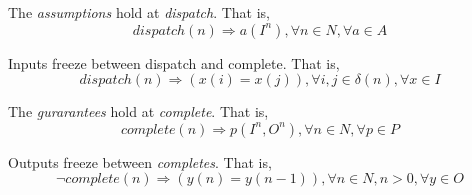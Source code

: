 The \emph{assumptions} hold at \emph{dispatch}. That is,
\begin{equation} 
\label{eqn:assumption}
dispatch(n) \Rightarrow a(I^n), \forall n\in N, \forall a \in A
\end{equation}

Inputs freeze between dispatch and complete. That is,
\begin{equation} 
\label{eqn:inputfreeze}
dispatch(n) \Rightarrow (x(i) = x(j)), \forall i,j\in \delta(n), \forall x \in I
\end{equation}

The \emph{gurarantees} hold at \emph{complete}. That is,
\begin{equation} 
\label{eqn:guarantee}
complete(n) \Rightarrow p(I^n, O^n), \forall n\in N, \forall p \in P
\end{equation}

Outputs freeze between \emph{completes}. That is,
\begin{equation} 
\label{eqn:outputfreeze}
\lnot complete(n) \Rightarrow (y(n) = y(n-1)), \forall n \in N, n>0, \forall y \in O
\end{equation}




